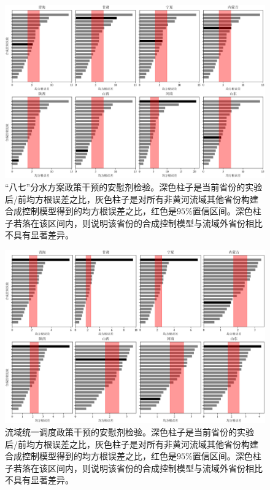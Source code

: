 \begin{figure}
    \includegraphics[width=0.9\linewidth]{img/ch5/ch5_rmse_87.png}
    \centering
    \caption[“八七”分水方案政策干预的安慰剂检验]{“八七”分水方案政策干预的安慰剂检验。深色柱子是当前省份的实验后/前均方根误差之比，灰色柱子是对所有非黄河流域其他省份构建合成控制模型得到的均方根误差之比，红色是$95\%$置信区间。深色柱子若落在该区间内，则说明该省份的合成控制模型与流域外省份相比不具有显著差异。}\label{fig:87placebo}
\end{figure}

\begin{figure}
    \includegraphics[width=0.9\linewidth]{img/ch5/ch5_rmse_98.png}
    \centering
    \caption[流域统一调度政策干预的安慰剂检验]{流域统一调度政策干预的安慰剂检验。深色柱子是当前省份的实验后/前均方根误差之比，灰色柱子是对所有非黄河流域其他省份构建合成控制模型得到的均方根误差之比，红色是$95\%$置信区间。深色柱子若落在该区间内，则说明该省份的合成控制模型与流域外省份相比不具有显著差异。}\label{fig:98placebo}
\end{figure}


